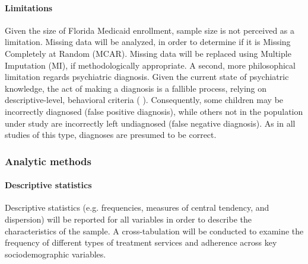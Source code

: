 \documentclass[twocolumn, serif, rga, authordate]{jote-article}
\begin{document}
\paragraph{Limitations} Given the size of Florida Medicaid enrollment,
sample size is not perceived as a limitation. Missing data will be
analyzed, in order to determine if it is Missing Completely at Random
(MCAR). Missing data will be replaced using Multiple Imputation (MI), if
methodologically appropriate. A second, more philosophical limitation
regards psychiatric diagnosis. Given the current state of psychiatric
knowledge, the act of making a diagnosis is a fallible process, relying
on descriptive-level, behavioral criteria ( \citeyear{Regier2013}).
Consequently, some children may be incorrectly diagnosed (false positive
diagnosis), while others not in the population under study are
incorrectly left undiagnosed (false negative diagnosis). As in all
studies of this type, diagnoses are presumed to be correct.


\subsubsection*{Analytic methods}


\paragraph{Descriptive statistics} Descriptive statistics (e.g.
frequencies, measures of central tendency, and dispersion) will be
reported for all variables in order to describe the characteristics of
the sample. A cross-tabulation will be conducted to examine the
frequency of different types of treatment services and adherence across
key sociodemographic variables.
\end{document}
